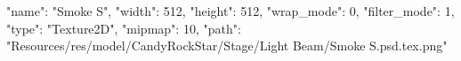 {
  "name": "Smoke S",
  "width": 512,
  "height": 512,
  "wrap_mode": 0,
  "filter_mode": 1,
  "type": "Texture2D",
  "mipmap": 10,
  "path": "Resources/res/model/CandyRockStar/Stage/Light Beam/Smoke S.psd.tex.png"
}